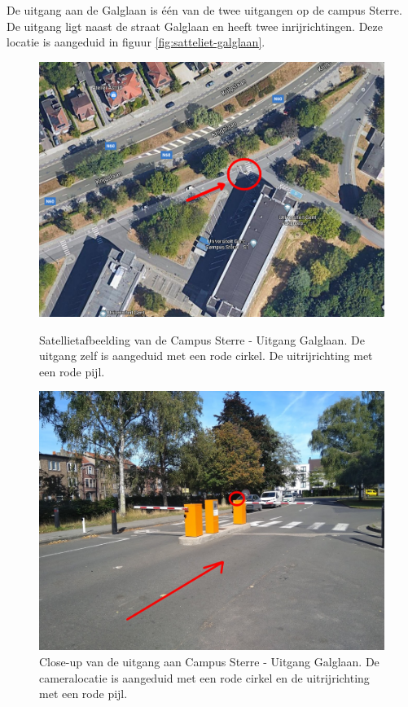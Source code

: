 De uitgang aan de Galglaan is één van de twee uitgangen op de campus Sterre. De uitgang ligt naast de straat Galglaan en heeft twee inrijrichtingen. Deze locatie is aangeduid in figuur \ref{fig:satteliet-galglaan}.
\begin{figure}[h!]
	\centering
	\includegraphics[width=0.8\linewidth]{img/res-galglaan/satteliet-galglaan.png}
	\caption{Satellietafbeelding van de Campus Sterre - Uitgang Galglaan. De uitgang zelf is aangeduid met een rode cirkel. De uitrijrichting met een rode pijl. \autocite{ugent2019google}}
	\label{fig:satteliet-galglaan}
	\centering
	\includegraphics[width=0.8\linewidth]{img/res-galglaan/galg.jpg}
	\caption{Close-up van de uitgang aan Campus Sterre - Uitgang Galglaan. De cameralocatie is aangeduid met een rode cirkel en de uitrijrichting met een rode pijl.}
	\label{fig:galglaan}
\end{figure}

